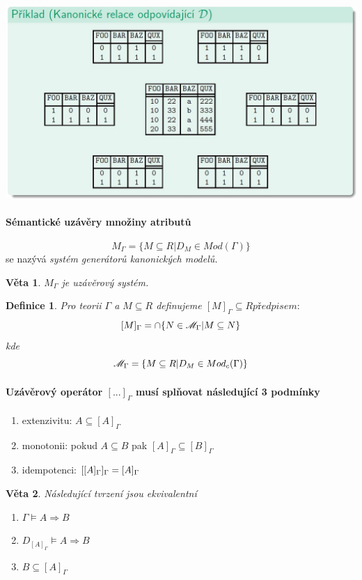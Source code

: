 \documentclass[10pt,a4paper]{article}
\newtheorem{veta}{Věta}
\newtheorem{definition}{Definice}
\begin{document}
\includegraphics[scale=0.37]{img/5-12.jpg}\\[2ex]

\paragraph{Sémantické uzávěry množiny atributů}
$$ M_\Gamma = \{M \subseteq R | D_M \in Mod(\Gamma) \} $$
se nazývá \emph{systém generátorů kanonických modelů.}\\

\begin{veta}
$M_\Gamma$ je uzávěrový systém.
\end{veta}
\begin{definition}
Pro teorii $\Gamma$ a $M \subseteq R$ definujeme $[M]_\Gamma \subseteq R předpisem:$
$$[M]_\Gamma = \cap\{N \in \mathscr{M}_\Gamma | M \subseteq N\}$$
kde $$\mathscr{M}_\Gamma = \{M \subseteq R | D_M \in Mod_c(\Gamma)\}$$
\end{definition}

\paragraph{Uzávěrový operátor $[...]_\Gamma$ musí splňovat následující 3 podmínky}
\begin{enumerate}
\item extenzivitu: $A \subseteq [A]_\Gamma$
\item monotonii: pokud $A \subseteq B$ pak $ [A]_\Gamma \subseteq [B]_\Gamma $
\item idempotenci: $[[A]_\Gamma]_\Gamma = [A]_\Gamma$
\end{enumerate}

\begin{veta}
Následující tvrzení jsou ekvivalentní
\begin{enumerate}[i]
\item $\Gamma \models A \Rightarrow B$
\item $D_{[A]_\Gamma} \models A \Rightarrow B$
\item $B \subseteq [A]_\Gamma$
\end{enumerate}
\end{veta}
\end{document}
